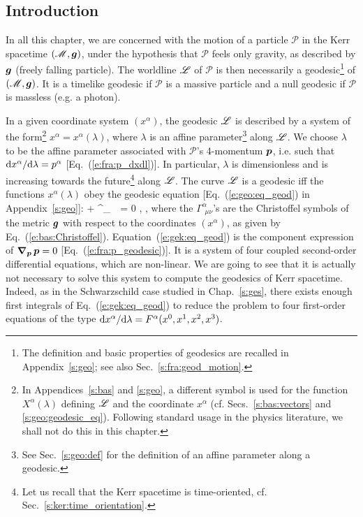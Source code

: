 \subsection{Introduction} \label{s:gek:geod_motion_intro}

In all this chapter, we are concerned with the motion of a particle
$\mathscr{P}$ in the Kerr spacetime $(\mathscr{M},\bm{g})$, under the hypothesis that $\mathscr{P}$
feels only gravity, as described by $\bm{g}$ (freely falling particle).
The worldline $\mathscr{L}$ of $\mathscr{P}$
is then necessarily a geodesic\footnote{The definition and basic properties of geodesics
are recalled in Appendix~\ref{s:geo}; see also Sec.~\ref{s:fra:geod_motion}.} of
$(\mathscr{M},\bm{g})$. It is a timelike geodesic if $\mathscr{P}$ is a massive particle
and a null geodesic if $\mathscr{P}$ is massless (e.g. a photon).

In a given coordinate system $(x^\alpha)$, the geodesic $\mathscr{L}$ is described
by a system of the form\footnote{In Appendices~\ref{s:bas} and \ref{s:geo},
a different symbol is used for the function $X^\alpha(\lambda)$ defining
$\mathscr{L}$ and the coordinate $x^\alpha$ (cf. Secs.~\ref{s:bas:vectors} and
\ref{s:geo:geodesic_eq}). Following standard usage in the physics literature,
we shall not do this in this chapter.}
$x^\alpha = x^\alpha(\lambda)$, where $\lambda$ is an
affine parameter\footnote{See Sec.~\ref{s:geo:def} for the definition
of an affine parameter along a geodesic.} along $\mathscr{L}$. We choose $\lambda$ to be the affine parameter
associated with $\mathscr{P}$'s 4-momentum $\bm{p}$,
i.e. such that $\mathrm{d} x^\alpha / \mathrm{d}\lambda = p^\alpha$ [Eq.~(\ref{e:fra:p_dxdl})].
In particular, $\lambda$ is dimensionless and is increasing towards the future\footnote{Let us recall that the Kerr spacetime is time-oriented, cf. Sec.~\ref{s:ker:time_orientation}.} along $\mathscr{L}$.
The curve $\mathscr{L}$ is a geodesic iff the functions $x^\alpha(\lambda)$ obey
the geodesic equation [Eq.~(\ref{e:geo:eq_geod}) in Appendix~\ref{s:geo}]:
\be \label{e:gek:eq_geod}
     + \Gamma^\alpha_{\ \, \mu \nu}
      = 0 , \leq \alpha {},
\ee
where the $\Gamma^\alpha_{\ \, \mu \nu}$'s are the Christoffel symbols of the metric $\bm{g}$
with respect to the coordinates $(x^\alpha)$, as given by Eq.~(\ref{e:bas:Christoffel}).
Equation~(\ref{e:gek:eq_geod}) is the component expression of
$\bm{\nabla}_{\bm{p}} \, \bm{p} = 0$ [Eq.~(\ref{e:fra:p_geodesic})]. It is
a system of four coupled second-order
differential equations, which are non-linear. We are going to see that it is actually not necessary to
solve this system to compute the geodesics of Kerr spacetime. Indeed,
as in the Schwarzschild case studied in Chap.~\ref{s:ges}, there exists
enough first integrals of Eq.~(\ref{e:gek:eq_geod}) to reduce
the problem to four first-order equations
of the type $\mathrm{d} x^\alpha/\mathrm{d}\lambda = F^\alpha(x^0, x^1, x^2, x^3)$.

